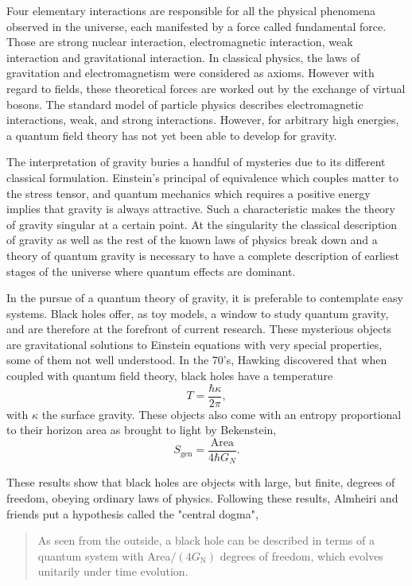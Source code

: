 Four elementary interactions are responsible for all the physical phenomena observed in the universe, each manifested by a force called fundamental force. Those are strong nuclear interaction, electromagnetic interaction, weak interaction and gravitational interaction. In classical physics, the laws of gravitation and electromagnetism were considered as axioms. However with regard to fields, these theoretical forces are worked out by the exchange of virtual bosons. The standard model of particle physics describes electromagnetic interactions, weak\cite{osti_4767615,PhysRevLett.19.1264}, and strong interactions. However, for arbitrary high energies, a quantum field theory has not yet been able to develop for gravity. 

The interpretation of gravity buries a handful of mysteries due to its different classical formulation. Einstein's principal of equivalence which couples matter to the stress tensor, and quantum mechanics which requires a positive energy implies that gravity is always attractive. Such a characteristic makes the theory of gravity singular at a certain point\cite{PhysRevD.14.2460}. At the singularity the classical description of gravity as well as the rest of the known laws of physics break down and a theory of quantum gravity is necessary to have a complete description of earliest stages of the universe where quantum effects are dominant.

In the pursue of a quantum theory of gravity, it is preferable to contemplate easy systems. Black holes offer, as toy models, a window to study quantum gravity, and are therefore at the forefront of current research. These mysterious objects are gravitational solutions to Einstein equations\cite{Schwarzschild:1916uq} with very special properties, some of them not well understood. In the 70's, Hawking discovered \cite{Hawking1975} that when coupled with quantum field theory, black holes have a temperature
\begin{equation}\label{Hawking temperature}
    T = \frac{\hbar \kappa}{2\pi},
\end{equation}
with $\kappa$ the surface gravity. These objects also come with an entropy proportional to their horizon area as brought to light by Bekenstein\cite{Bekenstein1972},
\begin{equation}\label{beken}
    S_{\text{gen}} = \frac{\text{Area}}{4\hbar G_N}.
\end{equation}

These results show that black holes are objects with large, but finite, degrees of freedom, obeying ordinary laws of physics. Following these results, Almheiri and friends \cite{almheiri2020entropy} put a hypothesis called the "central dogma",
\begin{quote}
    As seen from the outside, a black hole can be described in terms of a quantum system with Area$/\left(4G_\text{N}\right)$ degrees of freedom, which evolves unitarily under time evolution.
\end{quote}

